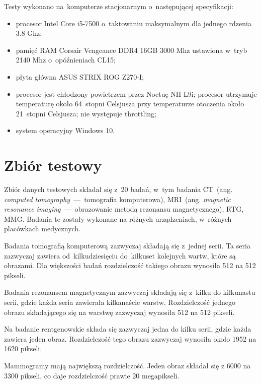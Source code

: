 \documentclass[a4paper,11pt,twoside,openright]{report}
\theoremstyle{definition}
\begin{document}
Testy wykonano na~komputerze stacjonarnym o~następującej specyfikacji:
\begin{itemize}[noitemsep]
\item procesor Intel Core i5-7500 o~taktowaniu maksymalnym dla jednego rdzenia 3.8 Ghz;
\item pamięć RAM Corsair Vengeance DDR4 16GB 3000 Mhz ustawiona w~tryb 2140 Mhz o~opóźnieniach CL15;
\item płyta główna ASUS STRIX ROG Z270-I;
\item procesor jest chłodzony powietrzem przez Noctuę NH-L9i; procesor utrzymuje
temperaturę około 64~stopni Celsjusza przy temperaturze otoczenia około 21~stopni
Celsjusza; nie występuje throttling;
\item system operacyjny Windows 10.
\end{itemize}

\section {Zbiór testowy}

Zbiór danych testowych składał się z~20 badań, w~tym badania
CT~(ang. \textit{computed tomography}~---~tomografia komputerowa),
MRI~(ang. \textit{magnetic resonance imaging}~---~obrazowanie metodą rezonansu magnetycznego),
RTG, MMG. Badania te zostały wykonane na różnych urządzeniach, w~różnych placówkach medycznych.

Badania tomografią komputerową zazwyczaj składają się z~jednej serii. Ta seria zazwyczaj zawiera od~kilkudziesięciu
do~kilkuset kolejnych wartw, które są obrazami. Dla większości badań rozdzielczość takiego obrazu wynosiła 512 na 512 pikseli.

Badania rezonansem magnetycznym zazwyczaj składają się z~kilku do kilkunastu serii, gdzie każda seria zawierała kilkanaście warstw.
Rozdzielczość jednego obrazu składającego się na warstwę zazwyczaj wynosiła 512 na 512 pikseli.

Na badanie rentgenowskie składa się zazwyczaj jedna do kilku serii, gdzie każda zawiera jeden obraz. Rozdzielczość tego obrazu zazwyczaj wynosiła około 1952 na 1620 pikseli.

Mammogramy mają największą rozdzielczość. Jeden obraz składał się z 6000 na 3300 pikseli, co daje rozdzielczość prawie 20 megapikseli.

\end{document}
